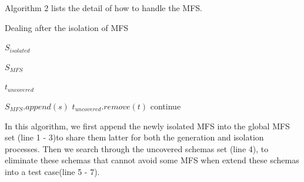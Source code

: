 \documentclass{sig-alternate}
\begin{document}

 Algorithm 2 lists the detail of how to handle the MFS.
\begin{algorithm}
  \caption{Dealing after the isolation of MFS}
  \begin{algorithmic}[1]
     \Require

     $S_{isolated}$ 


     $S_{MFS}$ 

     $t_{uncovered}$ 




       \State $S_{MFS}.append(s)$
     \EndFor
         \State  $t_{uncovered}.remove(t)$
       \Else
         \State continue
       \EndIf
     \EndFor
%
  \end{algorithmic}
\end{algorithm}

In this algorithm, we first append the newly isolated MFS into the global MFS set (line 1 - 3)to share them latter for both the generation and isolation processes. Then we search through the uncovered schemas set (line 4), to eliminate these schemas that cannot avoid some MFS when extend these schemas into a test case(line 5 - 7).
\end{document}
